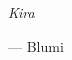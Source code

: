 
\thispagestyle{empty}

\vspace*{3cm}

\begin{center}
  {\itshape
    Kira
  }

  \medskip
--- Blumi
\end{center}

